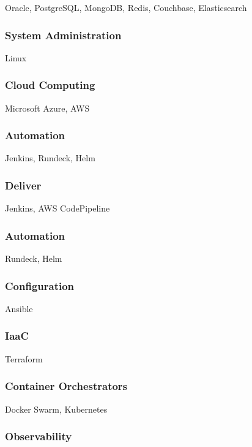 \documentclass{article}
\begin{document}
Oracle, PostgreSQL, MongoDB, Redis, Couchbase, Elasticsearch

\subsubsection{System Administration}

Linux

\subsubsection{Cloud Computing}

Microsoft Azure, AWS

\subsubsection{Automation}

Jenkins, Rundeck, Helm

\subsubsection{Deliver}

Jenkins, AWS CodePipeline

\subsubsection{Automation}

Rundeck, Helm

\subsubsection{Configuration}

Ansible

\subsubsection{IaaC}

Terraform

\subsubsection{Container Orchestrators}

Docker Swarm, Kubernetes

\subsubsection{Observability}
\end{document}
